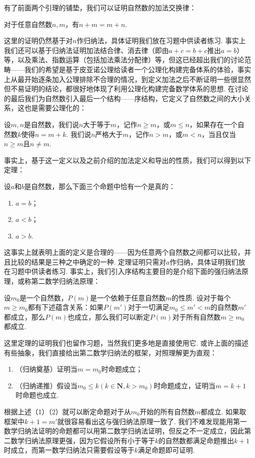 有了前面两个引理的铺垫，我们可以证明自然数的加法交换律：

\begin{theorem*}
    对于任意自然数$n,m$，有$n+m=m+n$.
\end{theorem*}
这里的证明仍然基于对$n$作归纳法，具体证明我们放在习题中供读者练习. 事实上我们还可以基于归纳法证明加法结合律、消去律（即由$a+c=b+c$推出$a=b$）等，以及乘法、指数运算（包括加法乘法分配律）等，但这已经超出我们的讨论范畴——我们的希望是基于皮亚诺公理给读者一个公理化构建完备体系的体验，事实上从最开始逐条加入公理排除不合理的情况，到定义加法之后不断证明一些很显然但不易证明的结论，都很好地体现了利用公理化构建完备数学体系的思想. 在讨论的最后我们为自然数引入最后一个结构——序结构，它定义了自然数之间的大小关系，这也是需要公理化的：

\begin{definition*}
    设$m,n$是自然数，我们说$n$大于等于$m$，记作$n\geqslant m$，或$m\leqslant n$，如果存在一个自然数$k$使得$n=m+k$. 我们说$n$严格大于$m$，记作$n>m$，或$m<n$，当且仅当$n\geqslant m$且$n\neq m$.
\end{definition*}

事实上，基于这一定义以及之前介绍的加法定义和导出的性质，我们可以得到以下定理：

\begin{theorem*}
    设$a$和$b$是自然数，那么下面三个命题中恰有一个是真的：
    \begin{enumerate}
        \item $a=b$；
        \item $a<b$；
        \item $a>b$.
    \end{enumerate}
\end{theorem*}

这事实上就表明上面的定义是合理的——因为任意两个自然数之间都可以比较，并且比较的结果是三种之中确定的一种. 定理证明只需对$a$作归纳，具体证明我们放在习题中供读者练习. 事实上，我们引入序结构主要目的是介绍下面的强归纳法原理，或称第二数学归纳法原理：

\begin{theorem*}
    设$m_0$是一个自然数，$P(m)$是一个依赖于任意自然数$m$的性质. 设对于每个$m\geqslant m_0$都有下述蕴含关系：如果$P(m')$对于一切满足$m_0\leqslant m'<m$的自然数$m'$都成立，那么$P(m)$也成立，那么我们可以断定$P(m)$对于所有自然数$m\geqslant m_0$都成立.
\end{theorem*}

这里定理的证明我们也留作习题，当然我们更多地是直接使用它. 或许上面的描述有些抽象，我们直接给出第二数学归纳法的框架，对照理解更为直观：
\begin{enumerate}
    \item （归纳奠基）证明当$m=m_0$时命题成立；
    \item （归纳递推）假设当$m_0\leqslant k(k\in\mathbf{N},k>m_0)$时命题成立，证明当$m=k+1$时命题也成立.
\end{enumerate}
根据上述（1）（2）就可以断定命题对于从$m_0$开始的所有自然数$m$都成立. 如果取框架中$k+1=m'$就很容易看出这与强归纳法原理一致了. 我们不难发现能用第一数学归纳法证明的命题都可以用第二数学归纳法证明，但反之不一定成立，因此第二数学归纳法原理更强，因为它假设所有小于等于$k$的自然数都满足命题推出$k+1$时成立，而第一数学归纳法只需要假设等于$k$满足命题即可证明.

